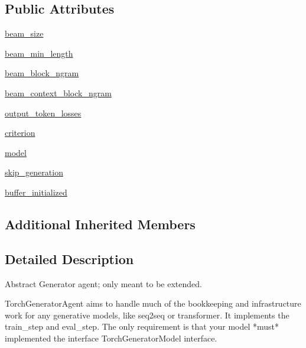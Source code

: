 \subsection*{Public Attributes}
\begin{DoxyCompactItemize}
\item 
\hyperlink{classparlai_1_1core_1_1torch__generator__agent_1_1TorchGeneratorAgent_acf02a68b75948cf5bafb24be48813127}{beam\+\_\+size}
\item 
\hyperlink{classparlai_1_1core_1_1torch__generator__agent_1_1TorchGeneratorAgent_a63f7f11d4917e843498e95dc87e30eb1}{beam\+\_\+min\+\_\+length}
\item 
\hyperlink{classparlai_1_1core_1_1torch__generator__agent_1_1TorchGeneratorAgent_a64484ea8971fc2a665e99f99a60f0653}{beam\+\_\+block\+\_\+ngram}
\item 
\hyperlink{classparlai_1_1core_1_1torch__generator__agent_1_1TorchGeneratorAgent_a7991351ff26caf7c59e24fe2e36bf6ea}{beam\+\_\+context\+\_\+block\+\_\+ngram}
\item 
\hyperlink{classparlai_1_1core_1_1torch__generator__agent_1_1TorchGeneratorAgent_ab6ff17d050234854c4ce34fbff73bf79}{output\+\_\+token\+\_\+losses}
\item 
\hyperlink{classparlai_1_1core_1_1torch__generator__agent_1_1TorchGeneratorAgent_aa6f478c963651331f919fc0ebd44bac3}{criterion}
\item 
\hyperlink{classparlai_1_1core_1_1torch__generator__agent_1_1TorchGeneratorAgent_a3b661c0eb6f3e65f061908142819bdc2}{model}
\item 
\hyperlink{classparlai_1_1core_1_1torch__generator__agent_1_1TorchGeneratorAgent_a713b4b7ae6d30a664c97c4ea121f8e38}{skip\+\_\+generation}
\item 
\hyperlink{classparlai_1_1core_1_1torch__generator__agent_1_1TorchGeneratorAgent_a427057bbe1b2182e5bbd476b7739de31}{buffer\+\_\+initialized}
\end{DoxyCompactItemize}
\subsection*{Additional Inherited Members}


\subsection{Detailed Description}
\begin{DoxyVerb}Abstract Generator agent; only meant to be extended.

TorchGeneratorAgent aims to handle much of the bookkeeping and infrastructure work
for any generative models, like seq2seq or transformer. It implements the train_step
and eval_step. The only requirement is that your model *must* implemented the
interface TorchGeneratorModel interface.
\end{DoxyVerb}
 

